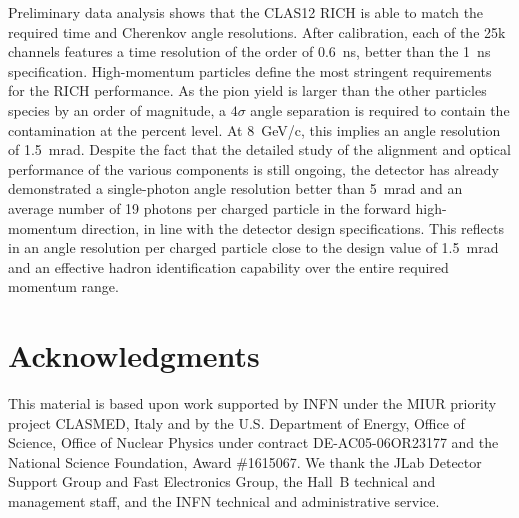 \documentclass[5p,times,twocolumn]{elsarticle}
\begin{document}
Preliminary data analysis shows that the CLAS12 RICH is able to match the 
required time and Cherenkov angle resolutions. After calibration, each
of the 25k channels features a time resolution of the order of 0.6~ns,
better than the 1~ns specification. High-momentum particles
define the most stringent requirements for the RICH performance. As the pion yield
is larger than the other particles species by an order of magnitude, a 
$4\sigma$ angle separation is required to contain the contamination 
at the percent level. At 8~GeV/c, this implies an angle resolution of 1.5~mrad.
Despite the fact that the detailed study of the alignment and optical performance of the various 
components is still ongoing, the detector has already demonstrated a single-photon 
angle resolution better than 5~mrad and an average number of 19 photons per charged particle
in the forward high-momentum direction, in line with the detector design specifications. This reflects in an angle resolution 
per charged particle close to the design value of 1.5~mrad and an effective hadron identification 
capability over the entire required momentum range.

\section{Acknowledgments}

This material is based upon work supported by INFN under the MIUR priority project CLASMED, Italy and by the
U.S. Department of Energy, Office of Science, Office of Nuclear Physics under contract DE-AC05-06OR23177 and
the National Science Foundation, Award \#1615067. We thank the JLab Detector Support Group and Fast Electronics
Group, the Hall~B technical and management staff, and the INFN technical and administrative service.
\end{document}
